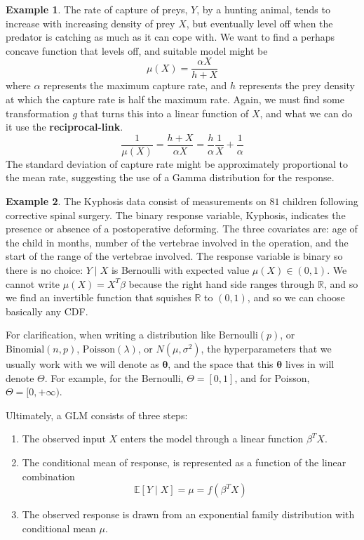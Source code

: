 \documentclass{article}
\theoremstyle{definition}
\newtheorem{example}{Example}[section]
\theoremstyle{remark}
\theoremstyle{definition}
\begin{document}
\begin{example}
The rate of capture of preys, $Y$, by a hunting animal, tends to increase with increasing density of prey $X$, but eventually level off when the predator is catching as much as it can cope with. We want to find a perhaps concave function that levels off, and suitable model might be 
\[\mu(X) = \frac{\alpha X}{h + X}\]
where $\alpha$ represents the maximum capture rate, and $h$ represents the prey density at which the capture rate is half the maximum rate. Again, we must find some transformation $g$ that turns this into a linear function of $X$, and what we can do it use the \textbf{reciprocal-link}. 
\[\frac{1}{\mu(X)} = \frac{h + X}{\alpha X} = \frac{h}{\alpha} \frac{1}{X} + \frac{1}{\alpha}\]
The standard deviation of capture rate might be approximately proportional to the mean rate, suggesting the use of a Gamma distribution for the response. 
\end{example}

\begin{example}
The Kyphosis data consist of measurements on $81$ children following corrective spinal surgery. The binary response variable, Kyphosis, indicates the presence or absence of a postoperative deforming. The three covariates are: age of the child in months, number of the vertebrae involved in the operation, and the start of the range of the vertebrae involved. The response variable is binary so there is no choice: $Y \mid X$ is Bernoulli with expected value $\mu(X) \in (0, 1)$. We cannot write $\mu(X) = X^T \beta$ because the right hand side ranges through $\mathbb{R}$, and so we find an invertible function that squishes $\mathbb{R}$ to $(0, 1)$, and so we can choose basically any CDF. 
\end{example}

For clarification, when writing a distribution like $\mathrm{Bernoulli}(p)$, or $\mathrm{Binomial}(n, p)$, $\mathrm{Poisson}(\lambda)$, or $N(\mu, \sigma^2)$, the hyperparameters that we usually work with we will denote as $\boldsymbol{\theta}$, and the space that this $\boldsymbol{\theta}$ lives in will denote $\Theta$. For example, for the Bernoulli, $\Theta = [0, 1]$, and for Poisson, $\Theta = [0, +\infty)$. 

Ultimately, a GLM consists of three steps: 
\begin{enumerate}
    \item The observed input $X$ enters the model through a linear function $\beta^T X$. 
    \item The conditional mean of response, is represented as a function of the linear combination 
    \[\mathbb{E}[Y \mid X] = \mu = f(\beta^T X)\]
    \item The observed response is drawn from an exponential family distribution with conditional mean $\mu$. 
\end{enumerate}
\end{document}
